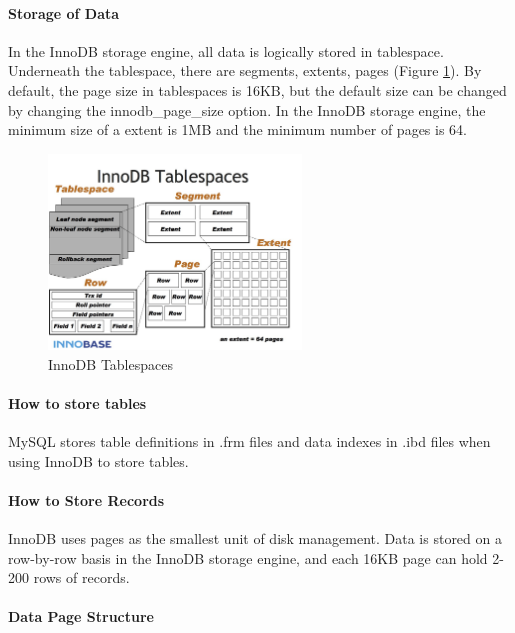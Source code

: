 \paragraph{Storage of Data}

In the InnoDB storage engine, all data is logically stored in tablespace. Underneath the tablespace, there are segments, extents, pages (Figure \ref{fig:tablespaces}). By default, the page size in tablespaces is 16KB, but the default size can be changed by changing the innodb\_page\_size option\cite{mysql_innodb_parameter}. In the InnoDB storage engine, the minimum size of a extent is 1MB and the minimum number of pages is 64.

\begin{figure}[hbt!]
    \centering
    \includegraphics[width=0.6\textwidth]{gfx/table_space.jpg}
    \caption{InnoDB Tablespaces \cite{innodb}}
    \label{fig:tablespaces}
\end{figure}

\paragraph{How to store tables}

MySQL stores table definitions in .frm files and data indexes in .ibd files when using InnoDB to store tables. 

\paragraph{How to Store Records}

InnoDB uses pages as the smallest unit of disk management. Data is stored on a row-by-row basis in the InnoDB storage engine, and each 16KB page can hold 2-200 rows of records.

\paragraph{Data Page Structure}

